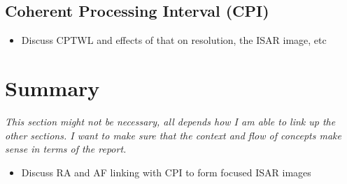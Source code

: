 \documentclass[class=report,11pt,crop=false]{standalone}
\begin{document}
    \subsection{Coherent Processing Interval (CPI)}
    \begin{itemize}
        \item Discuss CPTWL and effects of that on resolution, the ISAR image, etc
    \end{itemize}

    


\section{Summary}
\emph{This section might not be necessary, all depends how I am able to link up the other sections. I want to make sure that the context and flow of concepts make sense in terms of the report.}
\begin{itemize}
    \item Discuss RA and AF linking with CPI to form focused ISAR images
\end{itemize}



\ifstandalone

\printnoidxglossary[type=\acronymtype,nonumberlist]
\fi
\end{document}
